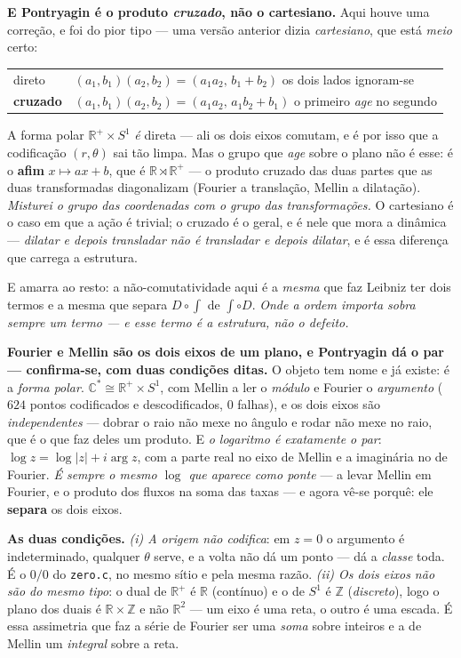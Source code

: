 \documentclass[11pt]{article}
\newcommand{\code}[1]{\texttt{\small #1}}
\newcommand{\Z}{\mathbb Z}
\newcommand{\R}{\mathbb R}
\newcommand{\C}{\mathbb C}
\theoremstyle{plain}
\theoremstyle{remark}
\begin{document}
\begin{itemize}
\textbf{E Pontryagin é o produto \emph{cruzado}, não o cartesiano.} Aqui houve uma correção, e
foi do pior tipo --- uma versão anterior dizia \emph{cartesiano}, que está \emph{meio} certo:
\begin{center}
\begin{tabular}{ll}
direto & $(a_1,b_1)(a_2,b_2)=(a_1a_2,\,b_1+b_2)$ \quad os dois lados ignoram-se \\
\textbf{cruzado} & $(a_1,b_1)(a_2,b_2)=(a_1a_2,\,a_1b_2+b_1)$ \quad o primeiro \emph{age} no segundo \\
\end{tabular}
\end{center}
A forma polar $\R^+\times S^1$ \emph{é} direta --- ali os dois eixos comutam, e é por isso que a
codificação $(r,\theta)$ sai tão limpa. Mas o grupo que \emph{age} sobre o plano não é esse: é o
\textbf{afim} $x\mapsto ax+b$, que é $\R\rtimes\R^+$ --- o produto cruzado das duas partes que as
duas transformadas diagonalizam (Fourier a translação, Mellin a dilatação). \emph{Misturei o grupo
das coordenadas com o grupo das transformações.} O cartesiano é o caso em que a ação é trivial; o
cruzado é o geral, e é nele que mora a dinâmica --- \emph{dilatar e depois transladar não é
transladar e depois dilatar}, e é essa diferença que carrega a estrutura.

E amarra ao resto: a não-comutatividade aqui é a \emph{mesma} que faz Leibniz ter dois termos e a
mesma que separa $D\circ\int$ de $\int\circ D$. \emph{Onde a ordem importa sobra sempre um termo ---
e esse termo é a estrutura, não o defeito.}

\textbf{Fourier e Mellin são os dois eixos de um plano, e Pontryagin dá o par ---
confirma-se, com duas condições ditas.} O objeto tem nome e já existe: é a \emph{forma polar}.
$\C^*\cong\R^+\times S^1$, com Mellin a ler o \emph{módulo} e Fourier o \emph{argumento} ($624$
pontos codificados e descodificados, $0$ falhas), e os dois eixos são \emph{independentes} ---
dobrar o raio não mexe no ângulo e rodar não mexe no raio, que é o que faz deles um produto. E
\emph{o logaritmo é exatamente o par}: $\log z=\log|z|+i\arg z$, com a parte real no eixo de Mellin
e a imaginária no de Fourier. \emph{É sempre o mesmo $\log$ que aparece como ponte} --- a levar
Mellin em Fourier, e o produto dos fluxos na soma das taxas --- e agora vê-se porquê: ele
\textbf{separa} os dois eixos.

\textbf{As duas condições.} \emph{(i) A origem não codifica}: em $z=0$ o argumento é
indeterminado, qualquer $\theta$ serve, e a volta não dá um ponto --- dá a \emph{classe} toda. É o
$0/0$ do \code{zero.c}, no mesmo sítio e pela mesma razão. \emph{(ii) Os dois eixos não são do
mesmo tipo}: o dual de $\R^+$ é $\R$ (contínuo) e o de $S^1$ é $\Z$ (\emph{discreto}), logo o plano
dos duais é $\R\times\Z$ e não $\R^2$ --- um eixo é uma reta, o outro é uma escada. É essa
assimetria que faz a série de Fourier ser uma \emph{soma} sobre inteiros e a de Mellin um
\emph{integral} sobre a reta.


\end{itemize}
\end{document}

